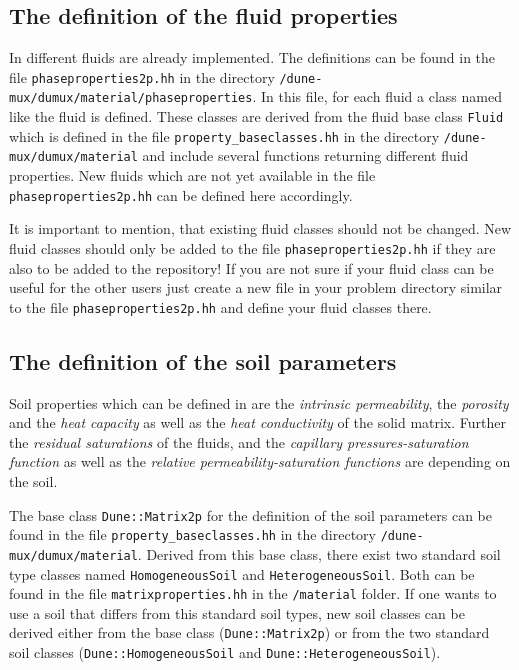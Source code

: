 \subsection{The definition of the fluid properties}\label{tutorial-coupled:description-fluid-class}

In \Dumux different fluids are already implemented. The definitions can be found in the file \texttt{phaseproperties2p.hh} in the directory \texttt{/dune-mux/dumux/material/phaseproperties}. In this file, for each fluid a class named like the fluid is defined. These classes are derived from the fluid base class \texttt{Fluid} which is defined in the file \texttt{property\_baseclasses.hh} in the directory \texttt{/dune-mux/dumux/material} and include several functions returning different fluid properties. New fluids which are not yet available in the file \texttt{phaseproperties2p.hh} can be defined here accordingly.

It is important to mention, that existing fluid classes should not be changed. New fluid classes should only be added to the file \texttt{phaseproperties2p.hh} if they are also to be added to the repository! If you are not sure if your fluid class can be useful for the other \Dumux users just create a new file in your problem directory similar to the file \texttt{phaseproperties2p.hh} and define your fluid classes there.

\subsection{The definition of the soil parameters}\label{tutorial-coupled:description-soil-class}

Soil properties which can be defined in \Dumux are the \textit{intrinsic permeability}, the \textit{porosity} and the \textit{heat capacity} as well as the \textit{heat conductivity} of the solid matrix. Further the \textit{residual saturations} of the fluids, and the \textit{capillary pressures-saturation function} as well as the \textit{relative permeability-saturation functions} are depending on the soil.

The base class \texttt{Dune::Matrix2p} for the definition of the soil parameters can be found in the file \texttt{property\_baseclasses.hh} in the directory \texttt{/dune-mux/dumux/material}. Derived from this base class, there exist two standard soil type classes named \texttt{HomogeneousSoil} and \texttt{HeterogeneousSoil}. Both can be found in the file \texttt{matrixproperties.hh} in the \texttt{/material} folder. If one wants to use a soil that differs from this standard soil types, new soil classes can be derived either from the base class (\texttt{Dune::Matrix2p}) or from the two standard soil classes (\texttt{Dune::HomogeneousSoil} and \texttt{Dune::HeterogeneousSoil}).

